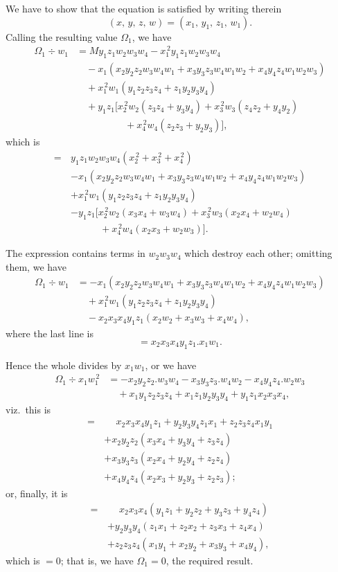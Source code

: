 \documentclass[11pt,a4paper]{article}
\theoremstyle{plain}
\theoremstyle{definition}
\begin{document}
We have to show that the equation is satisfied by writing therein
\[ (x,\, y,\, z,\, w) = (x_1,\, y_1,\, z_1,\, w_1). \]
Calling the resulting value $\Omega_1$, we have
\begin{align*}
\Omega_1 \div w_1 &= My_1z_1w_2w_3w_4 - x_1^{\,2}y_1z_1w_2w_3w_4 \\
&\quad - x_1(x_2y_2z_2w_3w_4w_1 + x_3y_3z_3w_4w_1w_2 + x_4y_4z_4w_1w_2w_3) \\
&\quad + x_1^{\,2}w_1(y_1z_2z_3z_4 + z_1y_2y_3y_4) \\
&\quad + y_1z_1[x_2^{\,2}w_2(z_3z_4 + y_3y_4) + x_3^{\,2}w_3(z_4z_2 + y_4y_2) \\
&\qquad\qquad\quad + x_4^{\,2}w_4(z_2z_3 + y_2y_3)],
\end{align*}
which is
\begin{align*}
=\, &y_1z_1w_2w_3w_4(x_2^{\,2} + x_3^{\,2} + x_4^{\,2}) \\
&- x_1(x_2y_2z_2w_3w_4w_1 + x_3y_3z_3w_4w_1w_2 + x_4y_4z_4w_1w_2w_3) \\
&+ x_1^{\,2}w_1(y_1z_2z_3z_4 + z_1y_2y_3y_4) \\
&- y_1z_1[x_2^{\,2}w_2(x_3x_4 + w_3w_4) + x_3^{\,2}w_3(x_2x_4 + w_2w_4) \\
&\qquad\quad + x_4^{\,2}w_4(x_2x_3 + w_2w_3)].
\end{align*}

The expression contains terms in $w_2w_3w_4$ which destroy each other; omitting them, we have
\begin{align*}
\Omega_1 \div w_1 &= -x_1(x_2y_2z_2w_3w_4w_1 + x_3y_3z_3w_4w_1w_2 + x_4y_4z_4w_1w_2w_3) \\
&\quad + x_1^{\,2}w_1(y_1z_2z_3z_4 + z_1y_2y_3y_4) \\
&\quad - x_2x_3x_4y_1z_1(x_2w_2 + x_3w_3 + x_4w_4),
\end{align*}
where the last line is
\[ = x_2x_3x_4y_1z_1 . x_1w_1. \]

Hence the whole divides by $x_1w_1$, or we have
\begin{align*}
\Omega_1 \div x_1w_1^{\,2} &= -x_2y_2z_2 . w_3w_4 - x_3y_3z_3 . w_4w_2 - x_4y_4z_4 . w_2w_3 \\
&\quad + x_1y_1z_2z_3z_4 + x_1z_1y_2y_3y_4 + y_1z_1x_2x_3x_4,
\end{align*}
viz.\ this is
\begin{align*}
=\, &\phantom{+} x_2x_3x_4y_1z_1 + y_2y_3y_4z_1x_1 + z_2z_3z_4x_1y_1 \\
&+ x_2y_2z_2(x_3x_4 + y_3y_4 + z_3z_4) \\
&+ x_3y_3z_3(x_2x_4 + y_2y_4 + z_2z_4) \\
&+ x_4y_4z_4(x_2x_3 + y_2y_3 + z_2z_3);
\end{align*}
or, finally, it is
\begin{align*}
=\, &\phantom{+} x_2x_3x_4(y_1z_1 + y_2z_2 + y_3z_3 + y_4z_4) \\
&+ y_2y_3y_4(z_1x_1 + z_2x_2 + z_3x_3 + z_4x_4) \\
&+ z_2z_3z_4(x_1y_1 + x_2y_2 + x_3y_3 + x_4y_4),
\end{align*}
which is $=0$; that is, we have $\Omega_1 = 0$, the required result.
\end{document}
